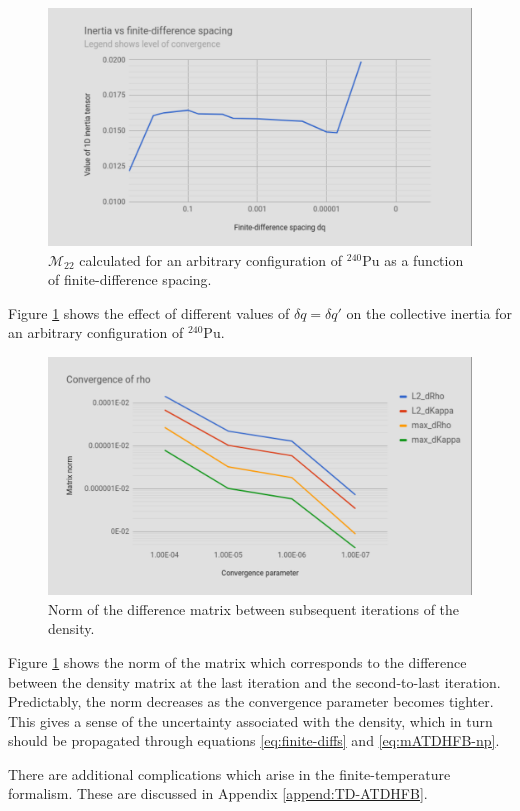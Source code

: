 \begin{figure}
	\centering
	\includegraphics[width=0.7\linewidth]{TeX_files/Num-dq_spacing}
	\caption[Collective inertia as a function of finite-difference spacing]{$\mathcal{M}_{22}$ calculated for an arbitrary configuration of $^{240}$Pu as a function of finite-difference spacing.}
	\label{fig:num-dqspacing}
\end{figure}

Figure \ref{fig:num-dqspacing} shows the effect of different values of $\delta q = \delta q'$ on the collective inertia for an arbitrary configuration of $^{240}$Pu.

\begin{figure}
	\centering
	\includegraphics[width=0.7\linewidth]{TeX_files/Num-rho_conv}
	\caption[Norm of the difference matrix between subsequent iterations of the density]{Norm of the difference matrix between subsequent iterations of the density.}
	\label{fig:num-rhoconv}
\end{figure}

Figure \ref{fig:num-dqspacing} shows the norm of the matrix which corresponds to the difference between the density matrix at the last iteration and the second-to-last iteration. Predictably, the norm decreases as the convergence parameter becomes tighter. This gives a sense of the uncertainty associated with the density, which in turn should be propagated through equations \ref{eq:finite-diffs} and \ref{eq:mATDHFB-np}.

There are additional complications which arise in the finite-temperature formalism. These are discussed in Appendix \ref{append:TD-ATDHFB}.

